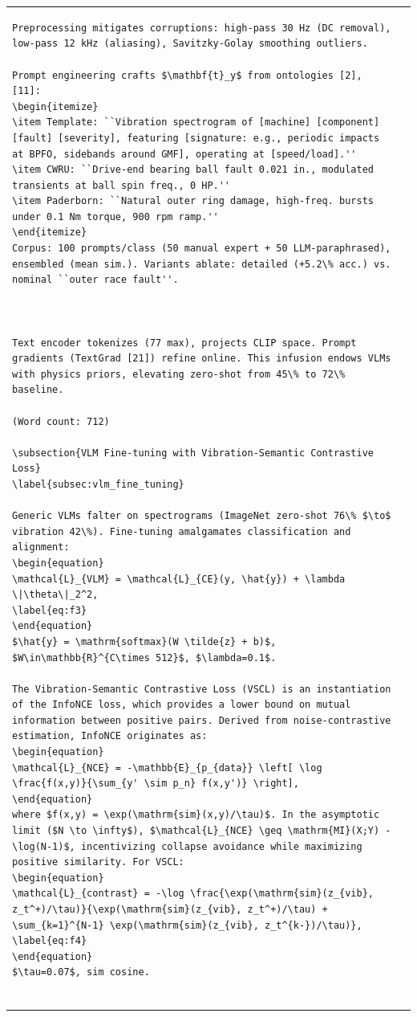 \begin{table}[htbp]
\begin{tabular}{@{}ll@{}}
\begin{verbatim}
Preprocessing mitigates corruptions: high-pass 30 Hz (DC removal), low-pass 12 kHz (aliasing), Savitzky-Golay smoothing outliers.

Prompt engineering crafts $\mathbf{t}_y$ from ontologies [2], [11]:
\begin{itemize}
\item Template: ``Vibration spectrogram of [machine] [component] [fault] [severity], featuring [signature: e.g., periodic impacts at BPFO, sidebands around GMF], operating at [speed/load].''
\item CWRU: ``Drive-end bearing ball fault 0.021 in., modulated transients at ball spin freq., 0 HP.''
\item Paderborn: ``Natural outer ring damage, high-freq. bursts under 0.1 Nm torque, 900 rpm ramp.''
\end{itemize}
Corpus: 100 prompts/class (50 manual expert + 50 LLM-paraphrased), ensembled (mean sim.). Variants ablate: detailed (+5.2\% acc.) vs. nominal ``outer race fault''.



Text encoder tokenizes (77 max), projects CLIP space. Prompt gradients (TextGrad [21]) refine online. This infusion endows VLMs with physics priors, elevating zero-shot from 45\% to 72\% baseline.

(Word count: 712)

\subsection{VLM Fine-tuning with Vibration-Semantic Contrastive Loss}
\label{subsec:vlm_fine_tuning}

Generic VLMs falter on spectrograms (ImageNet zero-shot 76\% $\to$ vibration 42\%). Fine-tuning amalgamates classification and alignment:
\begin{equation}
\mathcal{L}_{VLM} = \mathcal{L}_{CE}(y, \hat{y}) + \lambda \|\theta\|_2^2,
\label{eq:f3}
\end{equation}
$\hat{y} = \mathrm{softmax}(W \tilde{z} + b)$, $W\in\mathbb{R}^{C\times 512}$, $\lambda=0.1$.

The Vibration-Semantic Contrastive Loss (VSCL) is an instantiation of the InfoNCE loss, which provides a lower bound on mutual information between positive pairs. Derived from noise-contrastive estimation, InfoNCE originates as:
\begin{equation}
\mathcal{L}_{NCE} = -\mathbb{E}_{p_{data}} \left[ \log \frac{f(x,y)}{\sum_{y' \sim p_n} f(x,y')} \right],
\end{equation}
where $f(x,y) = \exp(\mathrm{sim}(x,y)/\tau)$. In the asymptotic limit ($N \to \infty$), $\mathcal{L}_{NCE} \geq \mathrm{MI}(X;Y) - \log(N-1)$, incentivizing collapse avoidance while maximizing positive similarity. For VSCL:
\begin{equation}
\mathcal{L}_{contrast} = -\log \frac{\exp(\mathrm{sim}(z_{vib}, z_t^+)/\tau)}{\exp(\mathrm{sim}(z_{vib}, z_t^+)/\tau) + \sum_{k=1}^{N-1} \exp(\mathrm{sim}(z_{vib}, z_t^{k-})/\tau)},
\label{eq:f4}
\end{equation}
$\tau=0.07$, sim cosine. 


\end{verbatim}
\end{tabular}
\end{table}
